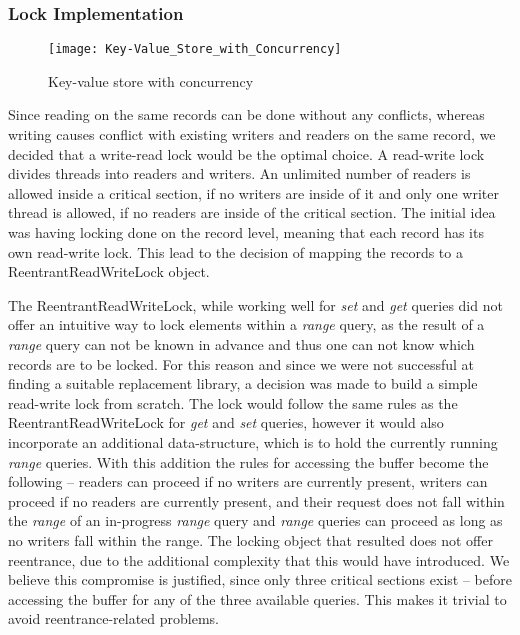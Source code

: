 \documentclass[a4paper, twocolumn,11pt]{article}
\begin{document}
\subsubsection{Lock Implementation}
\begin{figure}[h]
\texttt{[image: Key-Value\_Store\_with\_Concurrency]}
\caption{Key-value store with concurrency}
\end{figure}
Since reading on the same records can be done without any conflicts, whereas writing causes conflict with existing writers and readers on the same record, we decided that a write-read lock would be the optimal choice. A read-write lock divides threads into readers and writers. An unlimited number of readers is allowed inside a critical section, if no writers are inside of it and only one writer thread is allowed, if no readers are inside of the critical section. The initial idea was having locking done on the record level, meaning that each record has its own read-write lock. This lead to the decision of mapping the records to a ReentrantReadWriteLock object. 

The ReentrantReadWriteLock, while working well for \textit{set} and \textit{get} queries did not offer an intuitive way to lock elements within a \textit{range} query, as the result of a \textit{range} query can not be known in advance and thus one can not know which records are to be locked. For this reason and since we were not successful at finding a suitable replacement library, a decision was made to build a simple read-write lock from scratch. The lock would follow the same rules as the ReentrantReadWriteLock for \textit{get} and \textit{set} queries, however it would also incorporate an additional data-structure, which is to hold the currently running \textit{range} queries. With this addition the rules for accessing the buffer become the following – readers can proceed if no writers are currently present, writers can proceed if no readers are currently present, and their request does not fall within the \textit{range} of an in-progress \textit{range} query and \textit{range} queries can proceed as long as no writers fall within the range. The locking object that resulted does not offer reentrance, due to the additional complexity that this would have introduced. We believe this compromise is justified, since only three critical sections exist – before accessing the buffer for any of the three available queries. This makes it trivial to avoid reentrance-related problems.
\end{document}
